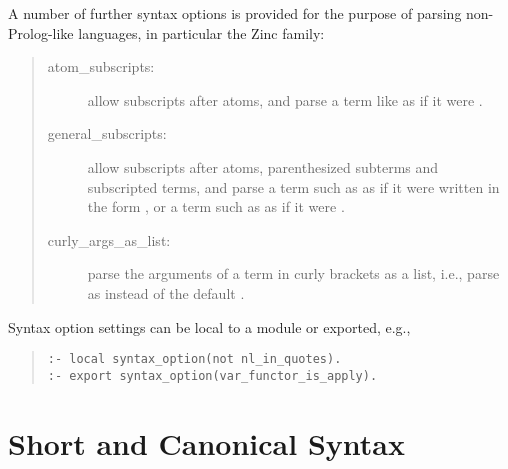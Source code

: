 A number of further syntax options is provided for the purpose of parsing
non-Prolog-like languages, in particular the Zinc family:
\begin{quote}
\begin{description}
\item[atom_subscripts:] allow subscripts after atoms, and parse a term
    like  as if it were .
\item[general_subscripts:] allow subscripts after atoms, parenthesized
    subterms and subscripted terms, and parse a term
    such as  as if it were written in the form
    ,
    or a term such as  as if it were
    .
\item[curly_args_as_list:] parse the arguments of a term in curly
    brackets as a list, i.e., parse 
    as \notation{\{\}([a,b,c])} instead of the default .
\end{description}
\end{quote}
Syntax option  settings can be local to a module or exported, e.g.,
\begin{quote}
\begin{verbatim}
:- local syntax_option(not nl_in_quotes).
:- export syntax_option(var_functor_is_apply).
\end{verbatim}
\end{quote}

\section{Short and Canonical Syntax}

